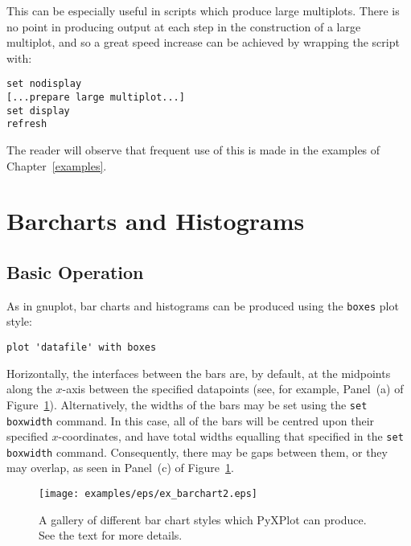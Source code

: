 \documentclass[a4paper,onecolumn,11pt]{book}
\begin{document}
This can be especially useful in scripts which produce large multiplots. There
is no point in producing output at each step in the construction of a large
multiplot, and so a great speed increase can be achieved by wrapping the script
with:

\begin{verbatim} 
set nodisplay
[...prepare large multiplot...]
set display
refresh
\end{verbatim}

The reader will observe that frequent use of this is made in the examples of
Chapter~\ref{examples}.

\section{Barcharts and Histograms}
\label{barcharts}

\subsection{Basic Operation}

As in gnuplot, bar charts and histograms can be produced using the
\texttt{boxes} plot style:

\begin{verbatim} 
plot 'datafile' with boxes
\end{verbatim}

\noindent Horizontally, the interfaces between the bars are, by default, at the
midpoints along the $x$-axis between the specified datapoints (see, for
example, Panel~(a) of Figure~\ref{fig:ex_barchart2}).  Alternatively, the
widths of the bars may be set using the \texttt{set boxwidth} command. In this
case, all of the bars will be centred upon their specified $x$-coordinates, and
have total widths equalling that specified in the \texttt{set
boxwidth} command.
Consequently, there may be gaps between them, or they may overlap, as seen in
Panel~(c) of Figure~\ref{fig:ex_barchart2}.

\begin{figure}
\begin{center}
\texttt{[image: examples/eps/ex\_barchart2.eps]}
\end{center}
\caption{A gallery of different bar chart styles which PyXPlot can produce. See the text for more details.}
\label{fig:ex_barchart2}
\end{figure}
\end{document}
